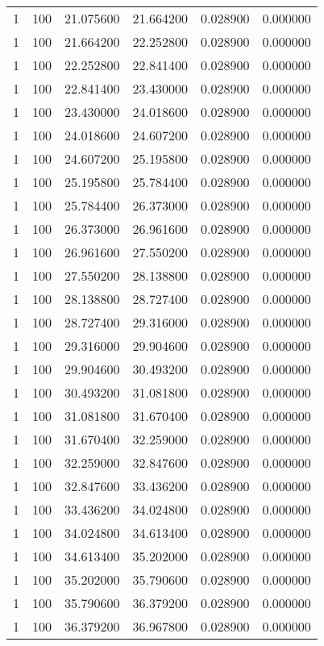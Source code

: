 \begin{longtable}{rrrrrr}
1 & 100 & 21.075600 & 21.664200 & 0.028900 & 0.000000 \\
1 & 100 & 21.664200 & 22.252800 & 0.028900 & 0.000000 \\
1 & 100 & 22.252800 & 22.841400 & 0.028900 & 0.000000 \\
1 & 100 & 22.841400 & 23.430000 & 0.028900 & 0.000000 \\
1 & 100 & 23.430000 & 24.018600 & 0.028900 & 0.000000 \\
1 & 100 & 24.018600 & 24.607200 & 0.028900 & 0.000000 \\
1 & 100 & 24.607200 & 25.195800 & 0.028900 & 0.000000 \\
1 & 100 & 25.195800 & 25.784400 & 0.028900 & 0.000000 \\
1 & 100 & 25.784400 & 26.373000 & 0.028900 & 0.000000 \\
1 & 100 & 26.373000 & 26.961600 & 0.028900 & 0.000000 \\
1 & 100 & 26.961600 & 27.550200 & 0.028900 & 0.000000 \\
1 & 100 & 27.550200 & 28.138800 & 0.028900 & 0.000000 \\
1 & 100 & 28.138800 & 28.727400 & 0.028900 & 0.000000 \\
1 & 100 & 28.727400 & 29.316000 & 0.028900 & 0.000000 \\
1 & 100 & 29.316000 & 29.904600 & 0.028900 & 0.000000 \\
1 & 100 & 29.904600 & 30.493200 & 0.028900 & 0.000000 \\
1 & 100 & 30.493200 & 31.081800 & 0.028900 & 0.000000 \\
1 & 100 & 31.081800 & 31.670400 & 0.028900 & 0.000000 \\
1 & 100 & 31.670400 & 32.259000 & 0.028900 & 0.000000 \\
1 & 100 & 32.259000 & 32.847600 & 0.028900 & 0.000000 \\
1 & 100 & 32.847600 & 33.436200 & 0.028900 & 0.000000 \\
1 & 100 & 33.436200 & 34.024800 & 0.028900 & 0.000000 \\
1 & 100 & 34.024800 & 34.613400 & 0.028900 & 0.000000 \\
1 & 100 & 34.613400 & 35.202000 & 0.028900 & 0.000000 \\
1 & 100 & 35.202000 & 35.790600 & 0.028900 & 0.000000 \\
1 & 100 & 35.790600 & 36.379200 & 0.028900 & 0.000000 \\
1 & 100 & 36.379200 & 36.967800 & 0.028900 & 0.000000 \\

\end{longtable}
